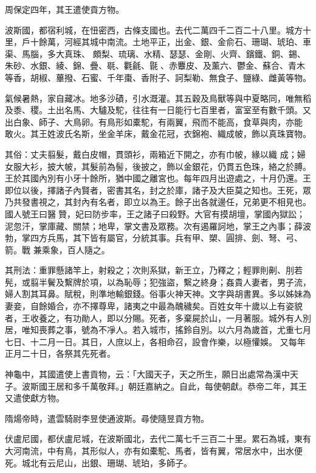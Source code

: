 \begin{pinyinscope}
 周保定四年，其王遣使貢方物。



 波斯國，都宿利城，在忸密西，古條支國也。去代二萬四千二百二十八里。城方十里，戶十餘萬，河經其城中南流。土地平正，出金、銀、金俞石、珊瑚、琥珀、車渠、馬腦，多大真珠、
 頗梨、琉璃、水精、瑟瑟、金剛、火齊、鑌鐵、銅、錫、朱砂、水銀、綾、錦、疊、毼、氍毹、毾、赤麞皮、及薰六、鬱金、蘇合、青木等香，胡椒、蓽撥、石蜜、千年棗、香附子、訶梨勒、無食子、鹽綠、雌黃等物。



 氣候暑熱，家自藏冰。地多沙磧，引水溉灌。其五穀及鳥獸等與中夏略同，唯無稻及黍、稷。土出名馬、大驢及駝，往往有一日能行七百里者，富室至有數千頭。又出白象、師子、大鳥卵。有鳥形如橐駝，有兩翼，飛而不能高，食草與肉，亦能敢火。其王姓波氏名斯，坐金羊床，戴金花冠，衣錦袍、織成帔，飾以真珠寶物。



 其俗：丈夫翦髮，戴白皮帽，貫頭衫，兩箱近下開之，亦有巾帔，緣以織
 成；婦女服大衫，披大帔，其髮前為髻，後披之，飾以金銀花，仍貫五色珠，絡之於膊。王於其國內別有小牙十餘所，猶中國之離宮也。每年四月出遊處之，十月仍還。王即位以後，擇諸子內賢者，密書其名，封之於庫，諸子及大臣莫之知也。王死，眾乃共發書視之，其封內有名者，即立以為王。餘子出各就邊任，兄弟更不相見也。國人號王曰醫贊，妃曰防步率，王之諸子曰殺野。大官有摸胡壇，掌國內獄訟；泥忽汗，掌庫藏、關禁；地卑，掌文書及眾務。次有遏羅訶地，掌王之內事；薛波勃，掌四方兵馬，其下皆有屬官，分統其事。兵有甲、槊、圓排、劍、弩、弓、箭。戰
 兼乘象，百人隨之。



 其刑法：重罪懸諸竿上，射殺之；次則系獄，新王立，乃釋之；輕罪則劓、刖若髡，或翦半鬢及繫牌於項，以為恥辱；犯強盜，繫之終身；姦貴人妻者，男子流，婦人割其耳鼻。賦稅，則準地輸銀錢。俗事火神天神。文字與胡書異。多以姊妹為妻妾，自餘婚合，亦不擇尊卑，諸夷之中最為醜穢矣。百姓女年十歲以上有姿貌者，王收養之，有功勛人，即以分賜。死者，多棄屍於山，一月著服。城外有人別居，唯知喪葬之事，號為不凈人。若入城市，搖鈴自別。以六月為歲首，尤重七月七日、十二月一日。其日，人庶以上，各相命召，設會作樂，以極懽娛。
 又每年正月二十日，各祭其先死者。



 神龜中，其國遣使上書貢物，云：「大國天子，天之所生，願日出處常為漢中天子。波斯國王居和多千萬敬拜。」朝廷嘉納之。自此，每使朝獻。恭帝二年，其王又遣使獻方物。



 隋煬帝時，遣雲騎尉李昱使通波斯。尋使隨昱貢方物。



 伏盧尼國，都伏盧尼城，在波斯國北，去代二萬七千三百二十里。累石為城，東有大河南流，中有鳥，其形似人，亦有如橐駝、馬者，皆有翼，常居水中，出水便死。城北有云尼山，出銀、珊瑚、琥珀，多師子。




\end{pinyinscope}
